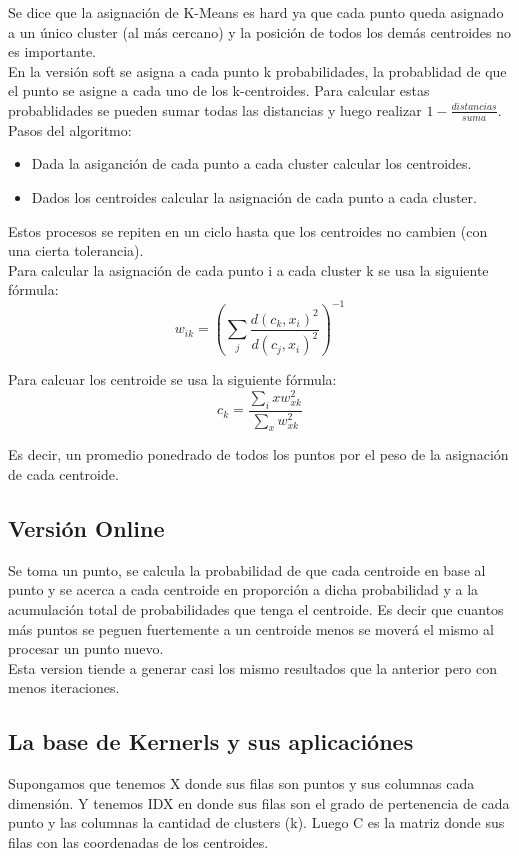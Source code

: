 \documentclass[titlepage,a4paper]{article}
\begin{document}
Se dice que la asignación de K-Means es hard ya que cada punto queda asignado a un único cluster (al más cercano) y la posición de todos los demás centroides no es importante. \\

En la versión soft se asigna a cada punto k probabilidades, la probablidad de que el punto se asigne a cada uno de los k-centroides.  Para calcular estas probablidades se pueden sumar todas las distancias y luego realizar $1-\frac{distancias}{suma}$. \\

Pasos del algoritmo: 
\begin{itemize}
\item Dada la asiganción de cada punto a cada cluster calcular los centroides. 
\item Dados los centroides calcular la asignación de cada punto a cada cluster. 
\end{itemize}

Estos procesos se repiten en un ciclo hasta que los centroides no cambien (con una cierta tolerancia). \\

Para calcular la asignación de cada punto i a cada cluster k se usa la siguiente fórmula: $$w_{ik} = (\sum_j \frac{d(c_{k}, x_{i})^2}{d(c_{j},x_i)^2})^{-1}$$

Para calcuar los centroide se usa la siguiente fórmula: $$c_k = \frac{\sum_i xw^2_{xk}}{\sum_x w^2_{xk}}$$

Es decir, un promedio ponedrado de todos los puntos por el peso de la asignación de cada centroide. 

\subsection*{Versión Online}
Se toma un punto, se calcula la probabilidad de que cada centroide en base al punto y se acerca a cada centroide en proporción a dicha probabilidad y a la acumulación total de probabilidades que tenga el centroide. Es decir que cuantos más puntos se peguen fuertemente a un centroide menos se moverá el mismo al procesar un punto nuevo. \\

Esta version tiende a generar casi los mismo resultados que la anterior pero con menos iteraciones. 


\subsection*{La base de Kernerls y sus aplicaciónes}
Supongamos que tenemos X donde sus filas son puntos y sus columnas cada dimensión. Y tenemos IDX en donde sus filas son el grado de pertenencia de cada punto y las columnas la cantidad de clusters (k). Luego C es la matriz donde sus filas con las coordenadas de los centroides.  \\
\end{document}
